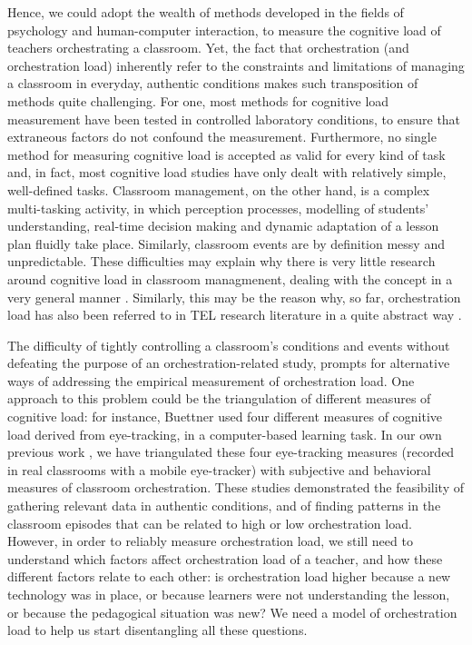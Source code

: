 \documentclass[10pt,journal,compsoc]{IEEEtran}
\begin{document}
Hence, we could adopt the wealth of methods developed in the fields of psychology and human-computer interaction, to measure the cognitive load of teachers orchestrating a classroom. Yet, the fact that orchestration (and orchestration load) inherently refer to the constraints and limitations of managing a classroom in everyday, authentic conditions \cite{Roschelle2013} makes such transposition of methods quite challenging. For one, most methods for cognitive load measurement have been tested in controlled laboratory conditions, to ensure that extraneous factors do not confound the measurement. Furthermore, no single method for measuring cognitive load is accepted as valid for every kind of task \cite{boucsein2000engineering} and, in fact, most cognitive load studies have only dealt with relatively simple, well-defined tasks. Classroom management, on the other hand, is a complex multi-tasking activity, in which perception processes, modelling of students' understanding, real-time decision making and dynamic adaptation of a lesson plan fluidly take place. Similarly, classroom events are by definition messy and unpredictable. These difficulties may explain why there is very little research around cognitive load in classroom managmenent, dealing with the concept in a very general manner \cite{feldon2007cognitive}. Similarly, this may be the reason why, so far, orchestration load has also been referred to in TEL research literature in a quite abstract way \cite{Cuendet2013, munoz2013sharing}.

The difficulty of tightly controlling a classroom's conditions and events without defeating the purpose of an orchestration-related study, prompts for alternative ways of addressing the empirical measurement of orchestration load. One approach to this problem could be the triangulation of different measures of cognitive load: for instance, Buettner \cite{Buettner2013} used four different measures of cognitive load derived from eye-tracking, in a computer-based learning task. In our own previous work \cite{Prieto2015ectel}, we have triangulated these four eye-tracking measures (recorded in real classrooms with a mobile eye-tracker) with subjective and behavioral measures of classroom orchestration. These studies demonstrated the feasibility of gathering relevant data in authentic conditions, and of finding patterns in the classroom episodes that can be related to high or low orchestration load. However, in order to reliably measure orchestration load, we still need to understand which factors affect orchestration load of a teacher, and how these different factors relate to each other: is orchestration load higher because a new technology was in place, or because learners were not understanding the lesson, or because the pedagogical situation was new? We need a model of orchestration load to help us start disentangling all these questions.
\end{document}
